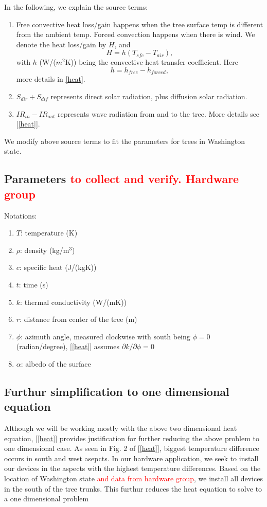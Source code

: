 \documentclass[12pt]{article}
\begin{document}
In the following, we explain the source terms: 
\begin{enumerate}
\item 
Free convective heat loss/gain happens when the tree surface temp is different from the ambient temp. Forced convection happens when there is wind. We denote the heat loss/gain by $H$, and 
\begin{equation}
H=h(T_{sfc}-T_{air}),
\end{equation}
with $h$ (W/($m^2$K)) being the convective heat transfer coefficient. Here
\begin{equation}
h=h_{free}-h_{forced},
\end{equation}
more details in \ref{heat}. 

\item $S_{dir}+S_{dif}$ represents direct solar radiation, plus diffusion solar radiation. 

\item $IR_{in}-IR_{out}$ represents wave radiation from and to the tree. More details see [\ref{heat}].

\end{enumerate}
We modify above source terms to fit the parameters for trees in Washington state.

\subsection{Parameters \textcolor{red}{to collect and verify. Hardware group}}
Notations: 
\begin{enumerate}
\item $T$: temperature (K)
\item $\rho$: density (kg/m$^3$)
\item $c$: specific heat (J/(kgK))
\item $t$: time (s)
\item $k$: thermal conductivity (W/(mK))
\item $r$: distance from center of the tree (m)
\item $\phi$: azimuth angle, measured clockwise with south being $\phi=0$ (radian/degree), [\ref{heat}] assumes $\partial k/\partial \phi=0$
\item $\alpha$: albedo of the surface
\end{enumerate}
\subsection{Furthur simplification to one dimensional equation}
Although we will be working mostly with the above two dimensional heat equation, [\ref{heat}] provides justification for further reducing the above problem to one dimensional case. As seen in Fig. 2 of [\ref{heat}], biggest temperature difference occurs in south and west asepcts. In our hardware application, we seek to install our devices in the aspects with the highest temperature differences. Based on the location of Washington state \textcolor{red}{and data from hardware group}, we install all devices in the south of the tree trunks. This furthur reduces the heat equation to solve to a one dimensional problem
\end{document}

